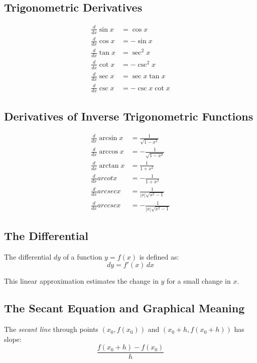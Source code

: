 \subsection{Trigonometric Derivatives}

\begin{align*}
\frac{d}{dx} \sin x &= \cos x \\
\frac{d}{dx} \cos x &= -\sin x \\
\frac{d}{dx} \tan x &= \sec^2 x \\
\frac{d}{dx} \cot x &= -\csc^2 x \\
\frac{d}{dx} \sec x &= \sec x \tan x \\
\frac{d}{dx} \csc x &= -\csc x \cot x
\end{align*}

\subsection{Derivatives of Inverse Trigonometric Functions}

\begin{align*}
\frac{d}{dx} \arcsin x &= \frac{1}{\sqrt{1 - x^2}} \\
\frac{d}{dx} \arccos x &= -\frac{1}{\sqrt{1 - x^2}} \\
\frac{d}{dx} \arctan x &= \frac{1}{1 + x^2} \\
\frac{d}{dx} arcot x &= -\frac{1}{1 + x^2} \\
\frac{d}{dx} arcsec x &= \frac{1}{|x|\sqrt{x^2 - 1}} \\
\frac{d}{dx} arccsc x &= -\frac{1}{|x|\sqrt{x^2 - 1}}
\end{align*}

\subsection{The Differential}

The differential \(dy\) of a function \(y = f(x)\) is defined as:
\[
dy = f'(x) \, dx
\]

This linear approximation estimates the change in \(y\) for a small change in \(x\).

\subsection{The Secant Equation and Graphical Meaning}

The \emph{secant line} through points \((x_0, f(x_0))\) and \((x_0 + h, f(x_0 + h))\) has slope:
\[
\frac{f(x_0 + h) - f(x_0)}{h}
\]


